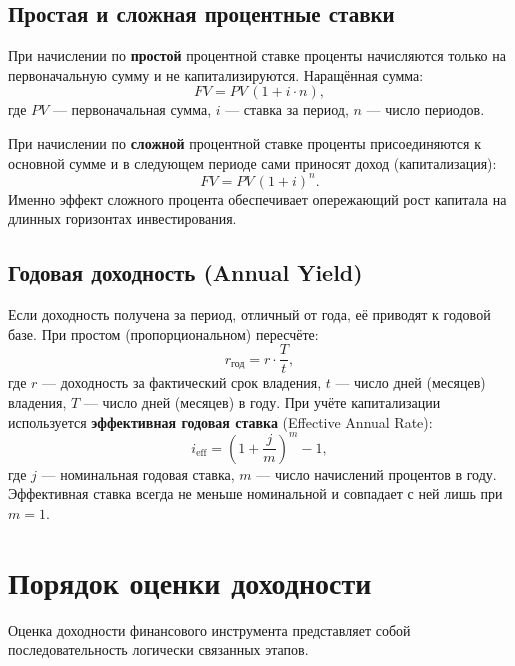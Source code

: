 \documentclass[14pt, a4paper]{extarticle}
\begin{document}
\subsection{Простая и сложная процентные ставки}

При начислении по \textbf{простой} процентной ставке проценты начисляются
только на первоначальную сумму и не капитализируются. Наращённая сумма:
\begin{equation}
  FV = PV\,(1 + i \cdot n),
\end{equation}
где $PV$ — первоначальная сумма, $i$ — ставка за период, $n$ — число периодов.

При начислении по \textbf{сложной} процентной ставке проценты присоединяются к
основной сумме и в следующем периоде сами приносят доход (капитализация):
\begin{equation}
  FV = PV\,(1 + i)^{n}.
\end{equation}
Именно эффект сложного процента обеспечивает опережающий рост капитала на
длинных горизонтах инвестирования.

\subsection{Годовая доходность (Annual Yield)}

Если доходность получена за период, отличный от года, её приводят к годовой
базе. При простом (пропорциональном) пересчёте:
\begin{equation}
  r_{\text{год}} = r \cdot \frac{T}{t},
\end{equation}
где $r$ — доходность за фактический срок владения, $t$ — число дней (месяцев)
владения, $T$ — число дней (месяцев) в году. При учёте капитализации
используется \textbf{эффективная годовая ставка} (Effective Annual Rate):
\begin{equation}
  i_{\text{eff}} = \left(1 + \frac{j}{m}\right)^{m} - 1,
\end{equation}
где $j$ — номинальная годовая ставка, $m$ — число начислений процентов в году.
Эффективная ставка всегда не меньше номинальной и совпадает с ней лишь при
$m = 1$.

\section{Порядок оценки доходности}

Оценка доходности финансового инструмента представляет собой
последовательность логически связанных этапов.
\end{document}
